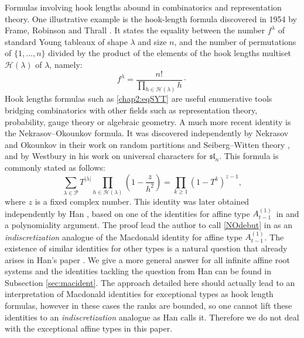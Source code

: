 \documentclass[11pt,letterpaper]{amsart}
\def\cch{\mathcal H}
\def\ccp{\mathcal P}
\numberwithin{equation}{section}
\numberwithin{df}{section}
\begin{document}
Formulas involving hook lengths abound in combinatorics and representation theory. One illustrative example is the hook-length formula discovered in 1954 by Frame, Robinson and Thrall \cite{FRT}. It states the equality between the number $f^\lambda$ of standard Young tableaux of shape $\lambda$ and size $n$, and the number of permutations of $\lbrace 1,\dots,n\rbrace$ divided by the product of the elements of the hook lengths multiset $\cch(\lambda)$ of $\lambda$, namely:
\begin{equation}\label{chap2:eqSYT}
f^\lambda=\frac{n!}{\displaystyle\prod_{h\in\cch(\lambda)}h}\cdot
\end{equation}
Hook lengths formulas such as \eqref{chap2:eqSYT} are useful enumerative tools bridging combinatorics with other fields such as representation theory, probability, gauge theory or algebraic geometry. A much more recent identity is the Nekrasov--Okounkov formula.  It was discovered independently by Nekrasov and Okounkov in their work on random partitions and Seiberg--Witten theory \cite{NO}, and by Westbury \cite{WeW} in his work on universal characters for $\mathfrak{sl}_n$. This formula is commonly stated as follows:
\begin{equation}\label{NOdebut}
\sum_{\lambda\in\ccp}T^{\lvert \lambda\rvert}\prod_{h\in\cch(\lambda)}\left(1-\frac{z}{h^2}\right)=\prod_{k\geq 1}\left(1-T^k\right)^{z-1},
\end{equation}
where $z$ is a fixed complex number.
This identity was later obtained independently by Han \cite{Ha}, based on one of the identities for affine type $A^{(1)}_{t-1}$~in \cite[Appendix $1$]{Mac} and a polynomiality argument. The proof lead the author to call \eqref{NOdebut} in \cite{Hancon} as an \textit{indiscretization} analogue of the Macdonald identity for affine type $A^{(1)}_{t-1}$. 
 The existence of similar identities for other types is a natural question that already arises in Han's paper \cite[Problem $6.4$]{Hancon}. We give a more general answer for all infinite affine root systems and the identities tackling the question from Han can be found in Subsection \ref{sec:macident}.
The approach detailed here should actually lead to an interpretation of Macdonald identities for exceptional types as hook length formulas, however in these cases the ranks are bounded, so one cannot lift these identities to an \textit{indiscretization} analogue as Han calls it. Therefore we do not deal with the exceptional affine types in this paper.
\end{document}
